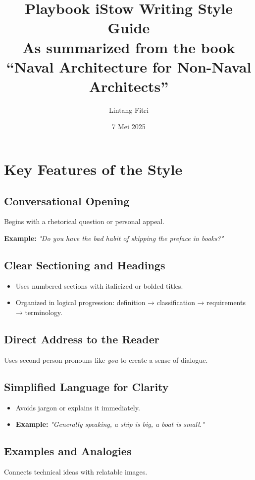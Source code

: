 \documentclass[12pt]{article}
\title{\textbf{Playbook iStow Writing Style Guide} \\[0.5em] 
       \large As summarized from the book ``Naval Architecture for Non-Naval Architects''}
\author{Lintang Fitri}
\date{7 Mei 2025}
\begin{document}
\maketitle

\section{Key Features of the Style}

\subsection{Conversational Opening}
Begins with a rhetorical question or personal appeal.

\textbf{Example:} \textit{"Do you have the bad habit of skipping the preface in books?"}

\subsection{Clear Sectioning and Headings}
\begin{itemize}
  \item Uses numbered sections with italicized or bolded titles.
  \item Organized in logical progression: definition → classification → requirements → terminology.
\end{itemize}

\subsection{Direct Address to the Reader}
Uses second-person pronouns like \textit{you} to create a sense of dialogue.

\subsection{Simplified Language for Clarity}
\begin{itemize}
  \item Avoids jargon or explains it immediately.
  \item \textbf{Example:} \textit{"Generally speaking, a ship is big, a boat is small."}
\end{itemize}

\subsection{Examples and Analogies}
Connects technical ideas with relatable images.
\end{document}
